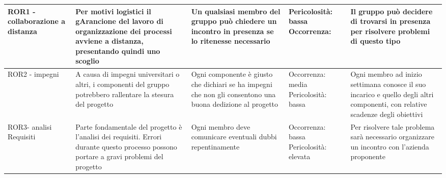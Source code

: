 {\begin{longtable}{C{.13\freewidth} C{.18\freewidth} C{.22\freewidth} C{.18\freewidth} C{.282379\freewidth}}
      ROR1 - collaborazione a distanza & Per motivi logistici il gArancione del lavoro di organizzazione dei processi avviene a distanza, presentando quindi uno scoglio & Un qualsiasi membro del gruppo può chiedere un incontro in presenza se lo ritenesse necessario
      & Pericolosità: bassa Occorrenza:  & Il gruppo può decidere di trovarsi in presenza per risolvere problemi di questo tipo \\
      \bottomrule
      ROR2 - impegni & A causa di impegni universitari o altri, i componenti del gruppo potrebbero rallentare la stesura del progetto & Ogni componente è giusto che dichiari se ha  impegni che non gli consentono una buona dedizione al progetto
      & Occorrenza: media Pericolosità: bassa & Ogni membro ad inizio settimana conosce il suo incarico e quello degli altri componenti, con relative scadenze degli obiettivi \\
      \bottomrule
      ROR3- analisi Requisiti & Parte fondamentale del progetto è l’analisi dei requisiti. Errori durante questo processo possono portare a gravi problemi del progetto & Ogni membro deve comunicare eventuali dubbi repentinamente 
      & Occorrenza: bassa Pericolosità: elevata & Per risolvere tale problema sarà necessario organizzare un incontro con l’azienda proponente \\
      \bottomrule
      \end{longtable}
   }

